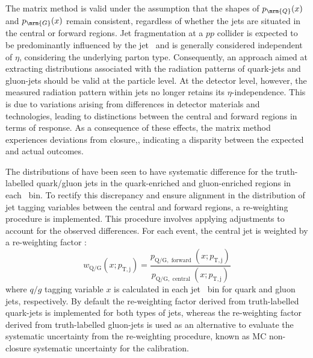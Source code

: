  
  The matrix method is valid under the assumption that the shapes of $p_{\mrm{Q}}(x)$ and $p_{\mrm{G}}(x)$ remain consistent, regardless of whether the jets are situated in the central or forward regions. Jet fragmentation at a $pp$ collider is expected to be predominantly influenced by the jet \pt~and is generally considered independent of $\eta$, considering the underlying parton type. Consequently, an approach aimed at extracting distributions associated with the radiation patterns of quark-jets and gluon-jets should be valid at the particle level. At the detector level, however, the measured radiation pattern within jets no longer retains its $\eta$-independence. This is due to variations arising from differences in detector materials and technologies, leading to distinctions between the central and forward regions in terms of response. As a consequence of these effects, the matrix method experiences deviations from closure,, indicating a disparity between the expected and actual outcomes.
  


The distributions of {\ntrk} have been seen to have systematic difference for the truth-labelled quark/gluon jets in the quark-enriched and gluon-enriched regions in each \pt~bin. To rectify this discrepancy and ensure alignment in the distribution of jet tagging variables between the central and forward regions, a re-weighting procedure is implemented. This procedure involves applying adjustments to account for the observed differences.  For each event, the central jet is weighted by a re-weighting factor :
\begin{equation}
w_{\mathrm{Q} / \mathrm{G}}\left(x ; p_{\mathrm{T}, \mathrm{j}}\right)=\frac{p_{\mathrm{Q} / \mathrm{G}, \text { forward }}\left(x ; p_{\mathrm{T}, \mathrm{j}}\right)}{p_{\mathrm{Q} / \mathrm{G}, \text { central }}\left(x ; p_{\mathrm{T}, \mathrm{j}}\right)}
\label{eq:QG-reweight}
\end{equation}
where $q/g$ tagging variable $x$ is calculated in each jet \pt~bin for quark and gluon jets, respectively. By default the re-weighting factor derived from truth-labelled quark-jets is implemented for both types of jets, whereas the re-weighting factor derived from truth-labelled gluon-jets is used as an alternative to evaluate the systematic uncertainty from the re-weighting procedure, known as MC non-closure systematic uncertainty for the calibration.



